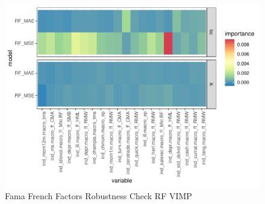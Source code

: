 \documentclass[11pt, a4paper, table]{article}
\begin{document}

\begin{figure}
	\includegraphics[]{../Results/empirical_ff/empirical_vimp.pdf}
	\caption{Fama French Factors Robustness Check RF VIMP}
\end{figure}

\FloatBarrier




\end{document}
